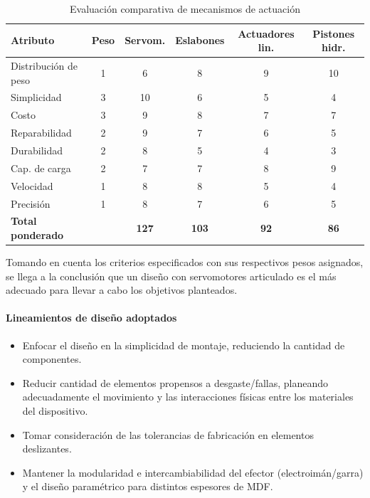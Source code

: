 \begin{table}[H]
\centering
\caption{Evaluación comparativa de mecanismos de actuación}
\begin{tabular}{lccccc}
\toprule
\textbf{Atributo} &\textbf{Peso} &\textbf{Servom.} &\textbf{Eslabones} &\textbf{Actuadores lin.} &\textbf{Pistones hidr.} \\
\midrule
Distribución de peso & 1 & 6  & 8  & 9 & 10 \\
Simplicidad          & 3 & 10 & 6  & 5 & 4  \\
Costo                & 3 & 9  & 8  & 7 & 7  \\
Reparabilidad        & 2 & 9  & 7  & 6 & 5  \\
Durabilidad          & 2 & 8  & 5  & 4 & 3  \\
Cap. de carga      & 2 & 7  & 7  & 8 & 9  \\
Velocidad            & 1 & 8  & 8  & 5 & 4  \\
Precisión            & 1 & 8  & 7  & 6 & 5  \\
\midrule
\textbf{Total ponderado}       &    & \textbf{127} & \textbf{103} & \textbf{92} & \textbf{86} \\
\bottomrule
\end{tabular}
\end{table}

Tomando en cuenta los criterios especificados con sus respectivos pesos asignados, se llega a la conclusión que un diseño con servomotores articulado es el más adecuado para llevar a cabo los objetivos planteados.

\paragraph{Lineamientos de diseño adoptados}
\begin{itemize}
  \item Enfocar el diseño en la simplicidad de montaje, reduciendo la cantidad de componentes.
  \item Reducir cantidad de elementos propensos a desgaste/fallas, planeando adecuadamente el movimiento y las interacciones físicas entre los materiales del dispositivo.  
  \item Tomar consideración de las tolerancias de fabricación en elementos deslizantes.
  \item Mantener la modularidad e intercambiabilidad del efector (electroimán/garra) y el diseño paramétrico para distintos espesores de MDF.\@
\end{itemize}

